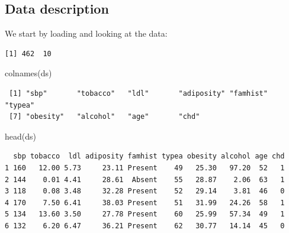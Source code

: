 \documentclass[
  letterpaper,
  DIV=11,
  numbers=noendperiod]{scrartcl}
\newenvironment{Shaded}{\begin{snugshade}}{\end{snugshade}}
\newcommand{\AttributeTok}[1]{\textcolor[rgb]{0.40,0.45,0.13}{#1}}
\newcommand{\DecValTok}[1]{\textcolor[rgb]{0.68,0.00,0.00}{#1}}
\newcommand{\FunctionTok}[1]{\textcolor[rgb]{0.28,0.35,0.67}{#1}}
\newcommand{\NormalTok}[1]{\textcolor[rgb]{0.00,0.23,0.31}{#1}}
\newcommand{\OtherTok}[1]{\textcolor[rgb]{0.00,0.23,0.31}{#1}}
\newcommand{\SpecialCharTok}[1]{\textcolor[rgb]{0.37,0.37,0.37}{#1}}
\newcommand{\StringTok}[1]{\textcolor[rgb]{0.13,0.47,0.30}{#1}}
\begin{document}
\hypertarget{data-description}{%
\subsection{Data description}\label{data-description}}

We start by loading and looking at the data:

\begin{Shaded}
\end{Shaded}

\begin{verbatim}
[1] 462  10
\end{verbatim}

\begin{Shaded}
\begin{Highlighting}[]
\FunctionTok{colnames}\NormalTok{(ds)}
\end{Highlighting}
\end{Shaded}

\begin{verbatim}
 [1] "sbp"       "tobacco"   "ldl"       "adiposity" "famhist"   "typea"    
 [7] "obesity"   "alcohol"   "age"       "chd"      
\end{verbatim}

\begin{Shaded}
\begin{Highlighting}[]
\FunctionTok{head}\NormalTok{(ds)}
\end{Highlighting}
\end{Shaded}

\begin{verbatim}
  sbp tobacco  ldl adiposity famhist typea obesity alcohol age chd
1 160   12.00 5.73     23.11 Present    49   25.30   97.20  52   1
2 144    0.01 4.41     28.61  Absent    55   28.87    2.06  63   1
3 118    0.08 3.48     32.28 Present    52   29.14    3.81  46   0
4 170    7.50 6.41     38.03 Present    51   31.99   24.26  58   1
5 134   13.60 3.50     27.78 Present    60   25.99   57.34  49   1
6 132    6.20 6.47     36.21 Present    62   30.77   14.14  45   0
\end{verbatim}
\end{document}
